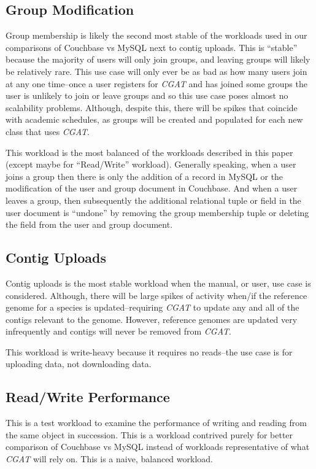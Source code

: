 \documentclass[10pt, conference, compsocconf]{IEEEtran}
\begin{document}
\subsection{Group Modification}
Group membership is likely the second most stable of the workloads used in our
comparisons of Couchbase vs MySQL next to contig uploads. This is ``stable''
because the majority of users will only join groups, and leaving groups will
likely be relatively rare. This use case will only ever be as bad as how many
users join at any one time--once a user registers for \textit{CGAT} and has
joined some groups the user is unlikely to join or leave groups and so this use
case poses almost no scalability problems. Although, despite this, there will
be spikes that coincide with academic schedules, as groups will be created and
populated for each new class that uses \textit{CGAT}.

This workload is the most balanced of the workloads described in this paper
(except maybe for ``Read/Write'' workload). Generally speaking, when a user joins a
group then there is only the addition of a record in MySQL or the modification
of the user and group document in Couchbase. And when a user leaves a group, then
subsequently the additional relational tuple or field in the user document is
``undone'' by removing the group membership tuple or deleting the field from
the user and group document.

\subsection{Contig Uploads}
Contig uploads is the most stable workload when the manual, or user, use case
is considered. Although, there will be large spikes of activity when/if the
reference genome for a species is updated--requiring \textit{CGAT} to update
any and all of the contigs relevant to the genome. However, reference genomes
are updated very infrequently and contigs will never be removed from
\textit{CGAT}.

This workload is write-heavy because it requires no reads--the use case is for
uploading data, not downloading data.

\subsection{Read/Write Performance}
This is a test workload to examine the performance of writing and reading from
the same object in succession. This is a workload contrived purely for better
comparison of Couchbase vs MySQL instead of workloads representative of what
\textit{CGAT} will rely on. This is a naive, balanced workload.
\end{document}
